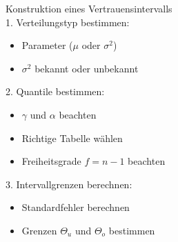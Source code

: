\begin{KR}{Konstruktion eines Vertrauensintervalls}\\
1. Verteilungstyp bestimmen:
   \begin{itemize}
     \item Parameter ($\mu$ oder $\sigma^2$)
     \item $\sigma^2$ bekannt oder unbekannt
   \end{itemize}

2. Quantile bestimmen:
   \begin{itemize}
     \item $\gamma$ und $\alpha$ beachten
     \item Richtige Tabelle wählen
     \item Freiheitsgrade $f=n-1$ beachten
   \end{itemize}

3. Intervallgrenzen berechnen:
   \begin{itemize}
     \item Standardfehler berechnen
     \item Grenzen $\Theta_u$ und $\Theta_o$ bestimmen
   \end{itemize}
\end{KR}



